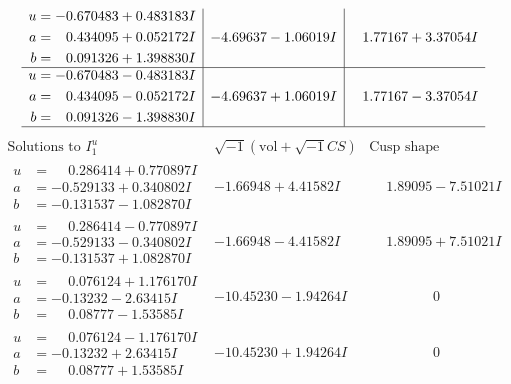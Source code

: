 \documentclass[1p]{elsarticle_modified}
\theoremstyle{definition}
\newcommand{\I}{\sqrt{-1}}
\begin{document}
$$\begin{array}{c|c|c}
\begin{aligned}
u &= -0.670483 + 0.483183 I \\
a &= \phantom{-}0.434095 + 0.052172 I \\
b &= \phantom{-}0.091326 + 1.398830 I\end{aligned}
 & -4.69637 - 1.06019 I & \phantom{-}1.77167 + 3.37054 I \\ \hline\begin{aligned}
u &= -0.670483 - 0.483183 I \\
a &= \phantom{-}0.434095 - 0.052172 I \\
b &= \phantom{-}0.091326 - 1.398830 I\end{aligned}
 & -4.69637 + 1.06019 I & \phantom{-}1.77167 - 3.37054 I\\
 \hline 
 \end{array}$$\newpage$$\begin{array}{c|c|c}  
\text{Solutions to }I^u_{1}& \I (\text{vol} + \sqrt{-1}CS) & \text{Cusp shape}\\
 \hline 
\begin{aligned}
u &= \phantom{-}0.286414 + 0.770897 I \\
a &= -0.529133 + 0.340802 I \\
b &= -0.131537 - 1.082870 I\end{aligned}
 & -1.66948 + 4.41582 I & \phantom{-}1.89095 - 7.51021 I \\ \hline\begin{aligned}
u &= \phantom{-}0.286414 - 0.770897 I \\
a &= -0.529133 - 0.340802 I \\
b &= -0.131537 + 1.082870 I\end{aligned}
 & -1.66948 - 4.41582 I & \phantom{-}1.89095 + 7.51021 I \\ \hline\begin{aligned}
u &= \phantom{-}0.076124 + 1.176170 I \\
a &= -0.13232 - 2.63415 I \\
b &= \phantom{-}0.08777 - 1.53585 I\end{aligned}
 & -10.45230 - 1.94264 I & \phantom{-0.000000 } 0 \\ \hline\begin{aligned}
u &= \phantom{-}0.076124 - 1.176170 I \\
a &= -0.13232 + 2.63415 I \\
b &= \phantom{-}0.08777 + 1.53585 I\end{aligned}
 & -10.45230 + 1.94264 I & \phantom{-0.000000 } 0 \\ \hline\begin{aligned}

\end{aligned}
\end{array}$$
\end{document}
